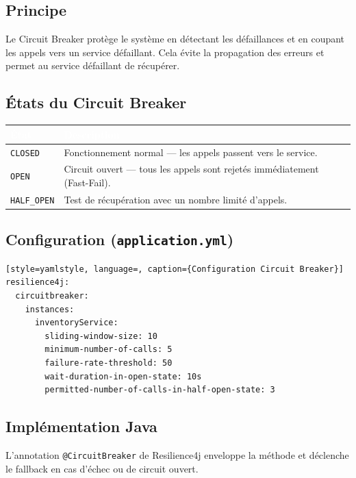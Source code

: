 \documentclass[11pt,a4paper]{article}
\newcommand{\hdrcell}[1]{\textbf{\textcolor{white}{#1}}}
\begin{document}
\subsection*{Principe}

Le Circuit Breaker protège le système en détectant les défaillances et en coupant les appels vers un service défaillant. Cela évite la propagation des erreurs et permet au service défaillant de récupérer.

\subsection*{États du Circuit Breaker}

\begin{tabularx}{\linewidth}{|l|X|}
    \hline
    \rowcolor{primaryblue} \hdrcell{État} & \hdrcell{Description} \\
    \hline
    \texttt{CLOSED} & Fonctionnement normal --- les appels passent vers le service. \\
    \hline
    \texttt{OPEN} & Circuit ouvert --- tous les appels sont rejetés immédiatement (Fast-Fail). \\
    \hline
    \texttt{HALF\_OPEN} & Test de récupération avec un nombre limité d'appels. \\
    \hline
\end{tabularx}

\subsection*{Configuration (\texttt{application.yml})}

\begin{lstlisting}[style=yamlstyle, language=, caption={Configuration Circuit Breaker}]
resilience4j:
  circuitbreaker:
    instances:
      inventoryService:
        sliding-window-size: 10
        minimum-number-of-calls: 5
        failure-rate-threshold: 50
        wait-duration-in-open-state: 10s
        permitted-number-of-calls-in-half-open-state: 3
\end{lstlisting}

\subsection*{Implémentation Java}

L'annotation \texttt{@CircuitBreaker} de Resilience4j enveloppe la méthode et déclenche le fallback en cas d'échec ou de circuit ouvert.
\end{document}

